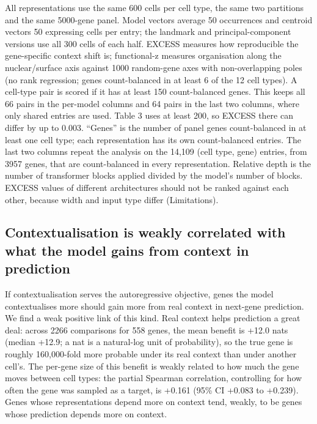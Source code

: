 \documentclass[
  11pt,
]{article}
\begin{document}
All representations use the same 600 cells per cell type, the same two
partitions and the same 5000-gene panel. Model vectors average 50
occurrences and centroid vectors 50 expressing cells per entry; the
landmark and principal-component versions use all 300 cells of each
half. EXCESS measures how reproducible the gene-specific context shift
is; functional-z measures organisation along the nuclear/surface axis
against 1000 random-gene axes with non-overlapping poles (no rank
regression; genes count-balanced in at least 6 of the 12 cell types). A
cell-type pair is scored if it has at least 150 count-balanced genes.
This keeps all 66 pairs in the per-model columns and 64 pairs in the
last two columns, where only shared entries are used. Table 3 uses at
least 200, so EXCESS there can differ by up to 0.003. ``Genes'' is the
number of panel genes count-balanced in at least one cell type; each
representation has its own count-balanced entries. The last two columns
repeat the analysis on the 14,109 (cell type, gene) entries, from 3957
genes, that are count-balanced in every representation. Relative depth
is the number of transformer blocks applied divided by the model's
number of blocks. EXCESS values of different architectures should not be
ranked against each other, because width and input type differ
(Limitations).

\subsection{Contextualisation is weakly correlated with what the model
gains from context in
prediction}\label{contextualisation-is-weakly-correlated-with-what-the-model-gains-from-context-in-prediction}

If contextualisation serves the autoregressive objective, genes the
model contextualises more should gain more from real context in
next-gene prediction. We find a weak positive link of this kind. Real
context helps prediction a great deal: across 2266 comparisons for 558
genes, the mean benefit is +12.0 nats (median +12.9; a nat is a
natural-log unit of probability), so the true gene is roughly
160,000-fold more probable under its real context than under another
cell's. The per-gene size of this benefit is weakly related to how much
the gene moves between cell types: the partial Spearman correlation,
controlling for how often the gene was sampled as a target, is +0.161
(95\% CI +0.083 to +0.239). Genes whose representations depend more on
context tend, weakly, to be genes whose prediction depends more on
context.
\end{document}
